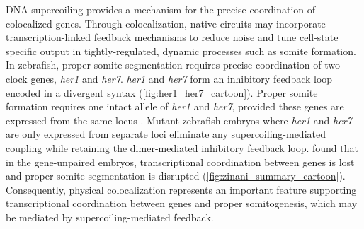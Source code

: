 \documentclass[11pt]{article}
\begin{document}
DNA supercoiling provides a mechanism for the precise coordination of colocalized genes. Through colocalization, native circuits may incorporate transcription-linked feedback mechanisms to reduce noise and tune cell-state specific output in tightly-regulated, dynamic processes such as somite formation. In zebrafish, proper somite segmentation requires precise coordination of two clock genes, \textit{her1} and \textit{her7}.   \textit{her1} and \textit{her7} form an inhibitory feedback loop encoded in a divergent syntax (\cref{fig:her1_her7_cartoon}). Proper somite formation requires one intact allele of \textit{her1} and \textit{her7}, provided these genes are expressed from the same locus \parencite{zinaniPairingSegmentationClock2021}.  Mutant zebrafish embryos where \emph{her1} and \emph{her7} are only expressed from separate loci eliminate any supercoiling-mediated coupling while retaining the dimer-mediated inhibitory feedback loop. \Textcite{zinaniPairingSegmentationClock2021} found that in the gene-unpaired embryos, transcriptional coordination between genes is lost and proper somite segmentation is disrupted (\cref{fig:zinani_summary_cartoon}). Consequently, physical colocalization represents an important feature supporting transcriptional coordination between genes and proper somitogenesis, which may be mediated by supercoiling-mediated feedback.
\end{document}

